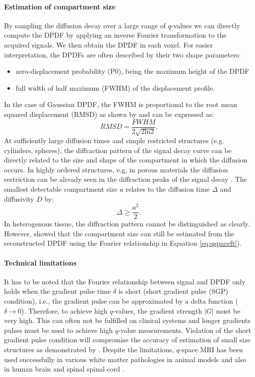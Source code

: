 \paragraph*{Estimation of compartment size}
By sampling the diffusion decay over a large range of $q$-values we can directly compute the DPDF by applying an inverse Fourier transformation to the acquired signals. We then obtain the DPDF in each voxel. For easier interpretation, the DPDFs are often described by their two shape parameters:
\begin{itemize}
	\item zero-displacement probability (P0), being the maximum height of the DPDF
	\item full width of half maximum (FWHM) of the displacement profile.
\end{itemize}
In the case of Gaussian DPDF, the FWHM is proportional to the root mean squared displacement (RMSD) as shown by \citet{Cory:1990} and can be expressed as:
\begin{equation}
	RMSD = \frac{FWHM}{2\sqrt{2\mbox{ln}2}}.
\end{equation}
At sufficiently large diffusion times and simple restricted structures (e.g. cylinders, spheres), the diffraction pattern of the signal decay curve can be directly related to the size and shape of the compartment in which the diffusion occurs. In highly ordered structures, e.g, in porous materials the diffusion restriction can be already seen in the diffraction peaks of the signal decay \citep{Callaghan:1996}. The smallest detectable compartment size $a$ relates to the diffusion time $\Delta$ and diffusivity $D$ by:
\begin{equation}
	\Delta \ge \frac{a^2}{2}.
\end{equation}   
In heterogenous tissue, the diffraction pattern cannot be distinguished as clearly. However, \citet{Cory:1990} showed that the compartment size can still be estimated from the reconstructed DPDF using the Fourier relationship in Equation \ref{eq:qspaceft}). 
\paragraph*{Technical limitations}
It has to be noted that the Fourier relationship between signal and DPDF only holds when the gradient pulse time $\delta$ is short (short gradient pulse (SGP) condition), i.e., the gradient pulse can be approximated by a delta function ($\delta\rightarrow 0$). Therefore, to achieve high $q$-values, the gradient strength $|G|$ must be very high. This can often not be fulfilled on clinical systems and longer gradients pulses must be used to achieve high $q$-value measurements. Violation of the short gradient pulse condition will compromise the accuracy of estimation of small size structures as demonstrated by \cite{Linse:1995, Latt:2007}. Despite the limitations, $q$-space MRI has been used successfully in various white matter pathologies in animal models \citep{Ong:2008} and also in human brain \citep{Assaf:2002} and spinal spinal cord \citep{Assaf:2000, Farrell:2008}.

